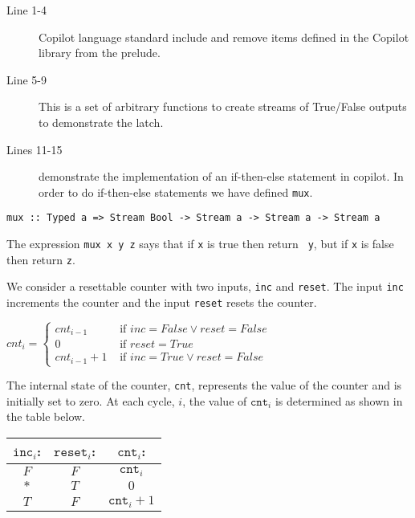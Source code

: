 \begin{description}
  \item[Line 1-4] Copilot language standard include and remove 
  items defined in the Copilot library from the prelude.
  \item[Line 5-9] This is a set of arbitrary functions to create streams of
  True/False outputs to demonstrate the latch.
  \item[Lines 11-15] demonstrate the implementation of an if-then-else statement in copilot. In order to do if-then-else statements we have defined {\tt mux}.
\end{description}

%
\begin{lstlisting}[language = Copilot, frame = single]
mux :: Typed a => Stream Bool -> Stream a -> Stream a -> Stream a
\end{lstlisting}
%

The expression {\tt mux x y z} says that if {\tt x} is true then return {\tt
y}, but if {\tt x} is false then return {\tt z}.

\begin{example} We consider a resettable counter with two inputs, {\tt inc} and
{\tt reset}.
%
The input {\tt inc} increments the counter and the input {\tt reset} resets the
counter.
%
\begin{center}
${cnt}_{i}=\begin{cases}
{cnt}_{i-1} & \text{ if } {inc} = False \vee {reset} = False \\
0 & \text{ if } {reset} = True\\
{cnt}_{i-1} + 1 & \text { if } {inc} = True \vee {reset} = False
\end{cases}$
\end{center} 
%
The internal state of the counter, {\tt cnt}, represents the value of the
counter and is initially set to zero. 
%
At each cycle, $i$, the value of $\mathtt{cnt}_i$ is determined as shown in the
table below.

\begin{center}
\begin{minipage}{0.25\linewidth}
\begin{tabular}{c|c||c}
$\mathtt{inc}_i$: & $\mathtt{reset}_i$: & $\mathtt{cnt}_i$:\\
\hline
$F$ & $F$ & $\mathtt{cnt}_{i}$ \\
\hline
$*$ & $T$ & $0$ \\
\hline
$T$ & $F$ & $\mathtt{cnt}_{i}+1$\\
\hline
\end{tabular}
\end{minipage}
\end{center}
\end{example}


